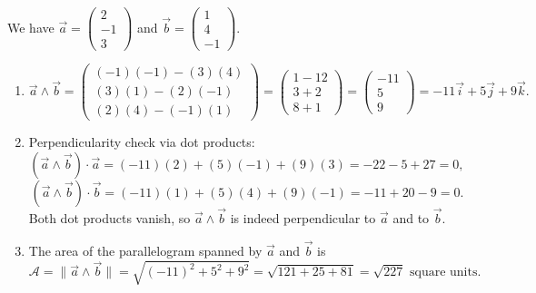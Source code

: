 \documentclass[11pt]{article}
\begin{document}
\begin{corrige}
We have $\vec{a} = \begin{pmatrix} 2 \\ -1 \\ 3 \end{pmatrix}$ and $\vec{b} = \begin{pmatrix} 1 \\ 4 \\ -1 \end{pmatrix}$.
\begin{enumerate}
\item
\[
\vec{a} \wedge \vec{b} = \begin{pmatrix} (-1)(-1) - (3)(4) \\ (3)(1) - (2)(-1) \\ (2)(4) - (-1)(1) \end{pmatrix}
= \begin{pmatrix} 1 - 12 \\ 3 + 2 \\ 8 + 1 \end{pmatrix}
= \begin{pmatrix} -11 \\ 5 \\ 9 \end{pmatrix} = -11\vec{i} + 5\vec{j} + 9\vec{k}.
\]
\item Perpendicularity check via dot products:
\[
(\vec{a} \wedge \vec{b}) \cdot \vec{a} = (-11)(2) + (5)(-1) + (9)(3) = -22 - 5 + 27 = 0,
\]
\[
(\vec{a} \wedge \vec{b}) \cdot \vec{b} = (-11)(1) + (5)(4) + (9)(-1) = -11 + 20 - 9 = 0.
\]
Both dot products vanish, so $\vec{a} \wedge \vec{b}$ is indeed perpendicular to $\vec{a}$ and to $\vec{b}$.
\item The area of the parallelogram spanned by $\vec{a}$ and $\vec{b}$ is
\[
\mathcal{A} = \|\vec{a} \wedge \vec{b}\| = \sqrt{(-11)^2 + 5^2 + 9^2} = \sqrt{121 + 25 + 81} = \sqrt{227} \text{ square units}.
\]
\end{enumerate}
\end{corrige}
\end{document}

